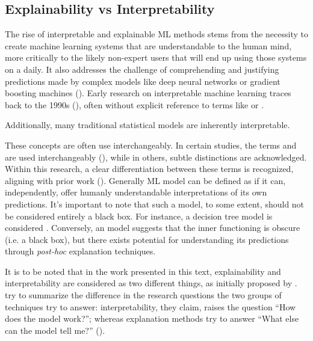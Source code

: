 \documentclass[binding=0.6cm]{sapthesis}
\newcommand{\mycite}[1]{(\cite{#1})}
\begin{document}
\subsection{Explainability vs Interpretability}
\label{sec:bg.xai.inter-vs-xai}
The rise of interpretable and explainable ML methods stems from the necessity to create machine learning systems that are understandable to the human mind, more critically to the likely non-expert users that will end up using those systems on a daily. It also addresses the challenge of comprehending and justifying predictions made by complex models like deep neural networks or gradient boosting machines \mycite{mason1999-nips-grad-desc,friedman2001-greedy-desc}. Early research on interpretable machine learning traces back to the 1990s \mycite{rudin2019-stop-epxlaining-black-box}, often without explicit reference to terms like  or . 

Additionally, many traditional statistical models are inherently interpretable.  %

These concepts are often use interchangeably. In certain studies, the terms  and  are used interchangeably \mycite{molnar2022}, while in others, subtle distinctions are acknowledged. Within this research, a clear differentiation between these terms is recognized, aligning with prior work \mycite{rudin2019-stop-epxlaining-black-box}. Generally ML model can be defined as  if it can, independently, offer humanly understandable interpretations of its own predictions. It's important to note that such a model, to some extent, should not be considered entirely a black box. For instance, a decision tree model is considered . Conversely, an  model suggests that the inner functioning is obscure (i.e. a black box), but there exists potential for understanding its predictions through \textit{post-hoc} explanation techniques.

It is to be noted that in the work presented in this text, explainability and interpretability are considered as two different things, as initially proposed by \cite{rudin2019-stop-epxlaining-black-box}. \cite{lipton2017-mythos} try to summarize the difference in the research questions the two groups of techniques try to answer: interpretability, they claim, raises the question “How does the model work?”; whereas explanation methods try to answer “What else can the model tell me?” \mycite{marcinkevičs2023-inter-vs-XAI}.
\end{document}
